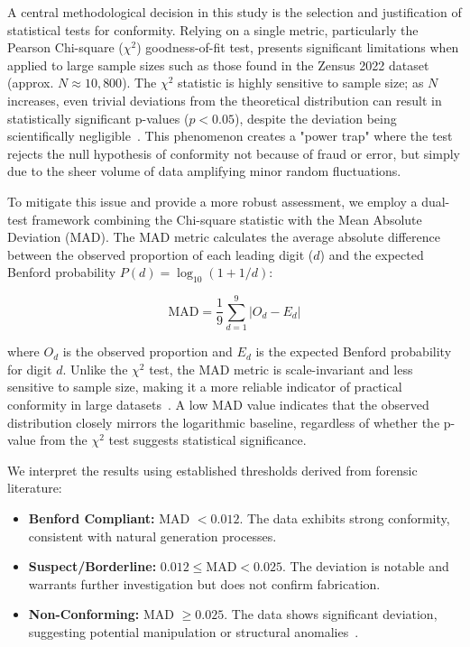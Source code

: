\documentclass[11pt,a4paper]{article}
\begin{document}
A central methodological decision in this study is the selection and justification of statistical tests for conformity. Relying on a single metric, particularly the Pearson Chi-square ($\chi^2$) goodness-of-fit test, presents significant limitations when applied to large sample sizes such as those found in the Zensus 2022 dataset (approx. $N \approx 10{,}800$). The $\chi^2$ statistic is highly sensitive to sample size; as $N$ increases, even trivial deviations from the theoretical distribution can result in statistically significant p-values ($p < 0.05$), despite the deviation being scientifically negligible~\cite{Cerqueti2021SomeNT}. This phenomenon creates a "power trap" where the test rejects the null hypothesis of conformity not because of fraud or error, but simply due to the sheer volume of data amplifying minor random fluctuations.

To mitigate this issue and provide a more robust assessment, we employ a dual-test framework combining the Chi-square statistic with the Mean Absolute Deviation (MAD). The MAD metric calculates the average absolute difference between the observed proportion of each leading digit ($d$) and the expected Benford probability $P(d) = \log_{10}(1 + 1/d)$:

$$
\text{MAD} = \frac{1}{9} \sum_{d=1}^{9} |O_d - E_d|
$$

where $O_d$ is the observed proportion and $E_d$ is the expected Benford probability for digit $d$. Unlike the $\chi^2$ test, the MAD metric is scale-invariant and less sensitive to sample size, making it a more reliable indicator of practical conformity in large datasets~\cite{Kossler2024SomeNI}. A low MAD value indicates that the observed distribution closely mirrors the logarithmic baseline, regardless of whether the p-value from the $\chi^2$ test suggests statistical significance.

We interpret the results using established thresholds derived from forensic literature:
\begin{itemize}
    \item \textbf{Benford Compliant:} MAD $< 0.012$. The data exhibits strong conformity, consistent with natural generation processes.
    \item \textbf{Suspect/Borderline:} $0.012 \leq \text{MAD} < 0.025$. The deviation is notable and warrants further investigation but does not confirm fabrication.
    \item \textbf{Non-Conforming:} MAD $\geq 0.025$. The data shows significant deviation, suggesting potential manipulation or structural anomalies~\cite{Azevedo2021ABL}.
\end{itemize}
\end{document}
